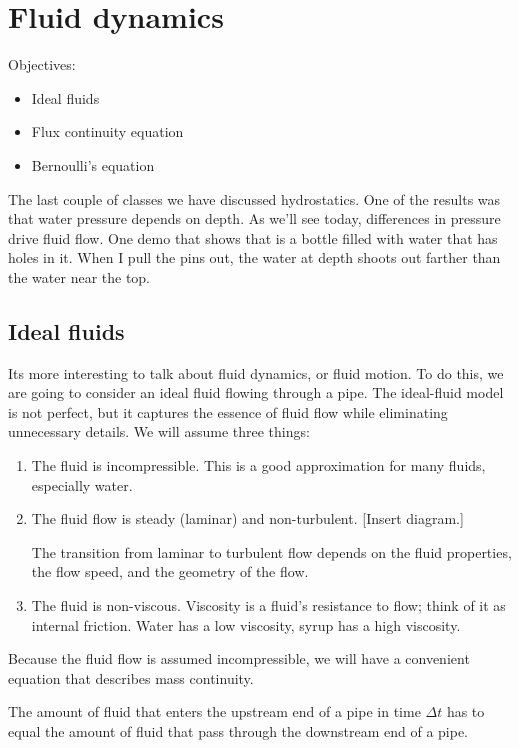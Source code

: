 \section{Fluid dynamics}
Objectives:
\begin{itemize}
\item Ideal fluids
\item Flux continuity equation
\item Bernoulli's equation
\end{itemize}


\hrulefill

The last couple of classes we have discussed hydrostatics. One of the results was that water pressure depends on depth. As we'll see today, differences in pressure drive fluid flow. One demo that shows that is a bottle filled with water that has holes in it. When I pull the pins out, the water at depth shoots out farther than the water near the top.

\subsection{Ideal fluids}
Its more interesting to talk about fluid dynamics, or fluid motion. To do this, we are going to consider an ideal fluid flowing through a pipe. The ideal-fluid model is not perfect, but it captures the essence of fluid flow while eliminating unnecessary details. We will assume three things:
\begin{enumerate}
\item The fluid is incompressible. This is a good approximation for many fluids, especially water.
\item The fluid flow is steady (laminar) and non-turbulent.
[Insert diagram.]
\vspace{5cm}

The transition from laminar to turbulent flow depends on the fluid properties, the flow speed, and the geometry of the flow.
\item The fluid is non-viscous. Viscosity is a fluid's resistance to flow; think of it as internal friction. Water has a low viscosity, syrup has a high viscosity.
\end{enumerate}

Because the fluid flow is assumed incompressible, we will have a convenient equation that describes mass continuity.

The amount of fluid that enters the upstream end of a pipe in time $\Delta{t}$ has to equal the amount of fluid that pass through the downstream end of a pipe.

